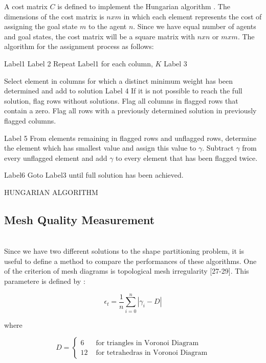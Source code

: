 A cost matrix  $C$ is defined to implement the Hungarian algorithm .  The dimensions of the cost matrix is $nxm$ in which each element represents the cost of assigning the goal state $m$ to the agent $n$.  Since we have equal number of agents and goal states, the cost matrix will be a square matrix with $nxn$ or $mxm$.  The algorithm for the assignment process as follows:
	
\begin{algorithm}[H]
Label1  \;
Label 2  \; 
{Repeat Label1 for each column, $K$}
Label 3  \; 

Select element in columns for which a distinct minimum weight has been determined and add to solution
Label 4 \;
If it is not possible to reach the full solution, flag rows without solutions. Flag all columns in flagged rows that contain a zero. Flag all rows with a previously determined solution in previously flagged columns.
     
Label 5 \;
From elements remaining in flagged rows and unflagged rows, determine the element which has smallest value and assign this value to $\gamma$. Subtract $\gamma$  from every unflagged element and add  $\gamma$ to every element that has been flagged twice.
     
Label6 \;
Goto Label3 until full solution has been achieved.
     
\caption{HUNGARIAN ALGORITHM}
\end{algorithm}

\subsection{Mesh Quality Measurement}\hspace{0pt} \\
Since we have two different solutions to the shape partitioning problem, it is useful to define a method to compare the performances of these algorithms. One of the criterion of mesh diagrams is topological mesh irregularity [27-29]. This parametere is defined by : 

\begin{equation}
\epsilon _t = \frac{1}{n} \sum_{i = 0}^{n} |\gamma _i - D|
\end{equation}
	
where 

\begin{equation}
D = \left\{ \begin{array}{rl}
6                               &\mbox{ for triangles in Voronoi Diagram} \\
12                             &\mbox{ for tetrahedras in Voronoi Diagram}
\end{array} \right.
\end{equation}
	
